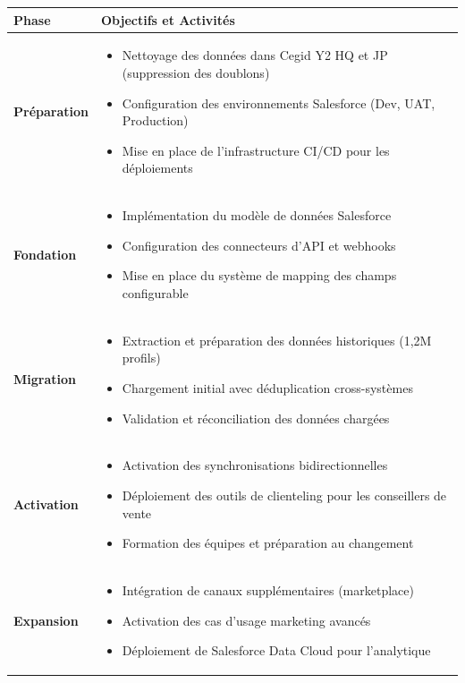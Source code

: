 \begin{center}
\begin{tabular}{|>{\bfseries}p{3cm}|p{11cm}|}
\hline
\rowcolor{lightblue} Phase & Objectifs et Activités \\
\hline
Préparation & 
\begin{itemize}
\item Nettoyage des données dans Cegid Y2 HQ et JP (suppression des doublons)
\item Configuration des environnements Salesforce (Dev, UAT, Production)
\item Mise en place de l'infrastructure CI/CD pour les déploiements
\end{itemize} \\
\hline
Fondation & 
\begin{itemize}
\item Implémentation du modèle de données Salesforce
\item Configuration des connecteurs d'API et webhooks
\item Mise en place du système de mapping des champs configurable
\end{itemize} \\
\hline
Migration & 
\begin{itemize}
\item Extraction et préparation des données historiques (1,2M profils)
\item Chargement initial avec déduplication cross-systèmes
\item Validation et réconciliation des données chargées
\end{itemize} \\
\hline
Activation & 
\begin{itemize}
\item Activation des synchronisations bidirectionnelles
\item Déploiement des outils de clienteling pour les conseillers de vente
\item Formation des équipes et préparation au changement
\end{itemize} \\
\hline
Expansion & 
\begin{itemize}
\item Intégration de canaux supplémentaires (marketplace)
\item Activation des cas d'usage marketing avancés
\item Déploiement de Salesforce Data Cloud pour l'analytique
\end{itemize} \\
\hline
\end{tabular}
\end{center}

